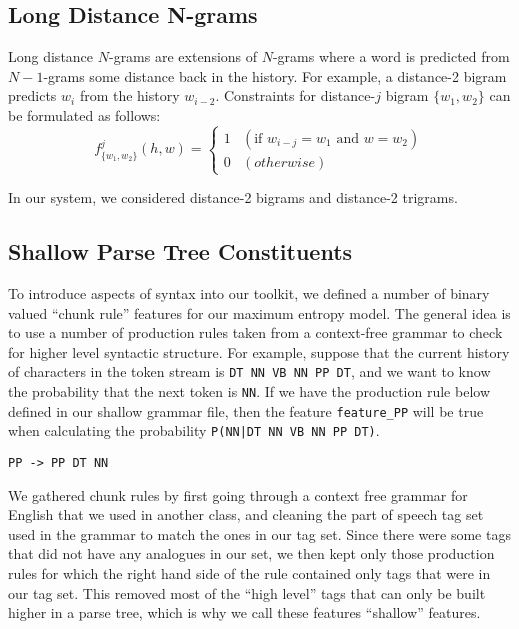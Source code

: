 \documentclass[11pt]{article}
\begin{document}
\subsection{Long Distance N-grams}

Long distance $N$-grams are extensions of $N$-grams where a word is predicted from $N-1$-grams some distance back in the history.
For example, a distance-2 bigram predicts $w_i$ from the history $w_{i-2}$.
Constraints for distance-$j$ bigram $\{w_1, w_2\}$ can be formulated as follows:
\[
  f_{\{w_1, w_2\}}^{j}(h, w) = \begin{cases}
    1 & (\textrm{if } w_{i-j} = w_1 \textrm{ and } w = w_2) \\
    0 & (otherwise)
  \end{cases}
\]

\noindent
In our system, we considered distance-2 bigrams and distance-2 trigrams.

\subsection{Shallow Parse Tree Constituents}

To introduce aspects of syntax into our toolkit, we defined a number of
binary valued ``chunk rule'' features for our maximum entropy model. The
general idea is to use a number of production rules taken from a
context-free grammar to check for higher level syntactic structure. For
example, suppose that the current history of characters in the token
stream is \texttt{DT NN VB NN PP DT}, and we want to know the
probability that the next token is \texttt{NN}. If we have the 
production rule below defined in our shallow grammar file, then the
feature \texttt{feature\_PP} will be true when calculating the
probability \texttt{P(NN|DT NN VB NN PP DT)}.

\begin{verbatim}
PP -> PP DT NN
\end{verbatim}

We gathered chunk rules by first going through a context free grammar
for English that we used in another class, and cleaning the part of
speech tag set used in the grammar to match the ones in our tag set.
Since there were some tags that did not have any analogues in our set,
we then kept only those production rules for which the right hand side
of the rule contained only tags that were in our tag set. This removed
most of the ``high level'' tags that can only be built higher in a parse
tree, which is why we call these features ``shallow'' features.
\end{document}
